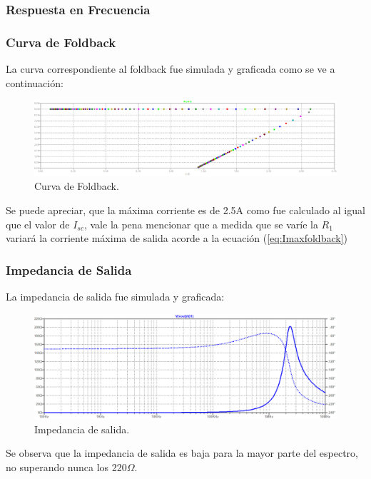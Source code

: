 \subsubsection{Respuesta en Frecuencia}
\subsubsection{Curva de Foldback}
La curva correspondiente al foldback fue simulada y graficada como se ve a continuación:
\begin{figure}[H]
\centering
	\includegraphics[width=1\textwidth]{ImagenesEjercicio2/curvefoldback.png}
	\caption{Curva de Foldback.}
	\label{fig:GraficoFOldbacki}
\end{figure}
Se puede apreciar, que la máxima corriente es de 2.5A como fue calculado al igual que el valor de $I_{sc}$, vale la pena mencionar que a medida que se varíe la $R_1$ variará la corriente máxima de salida acorde a la ecuación (\ref{eq:Imaxfoldback})
\subsubsection{Impedancia de Salida}
La impedancia de salida fue simulada y graficada:
\begin{figure}[H]
\centering
	\includegraphics[width=1\textwidth]{ImagenesEjercicio2/zoutspice.png}
	\caption{Impedancia de salida.}
	\label{fig:zout}
\end{figure}
Se observa que la impedancia de salida es baja para la mayor parte del espectro, no superando nunca los 220$\Omega$.
